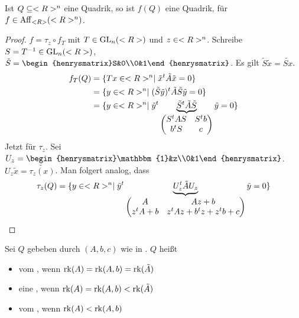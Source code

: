 \begin{lemma}
	Ist $Q\subseteq<R>^n$ eine Quadrik, so ist $f(Q)$ eine Quadrik, für $f\in\operatorname{Aff}_{<R>}(<R>^n)$.
\end{lemma}
\begin{proof}
	$f=\tau_z\circ f_T$ mit $T\in\operatorname{GL}_n(<R>)$ und $z\in<R>^n$. Schreibe $S=T^{-1}\in\operatorname{GL}_n(<R>)$, $\tilde{S}=\begin{henrysmatrix}S&0\\0&1\end{henrysmatrix}$. Es gilt $\tilde{S}\tilde{x}=\tilde{Sx}$.
	\begin{align}
		f_T(Q)&=\{Tx\in<R>^n\mid \tilde{x}^t\tilde{A}\tilde{x}=0\}\notag \\
		&=\{y\in<R>^n\mid (\tilde{S}\tilde{y})^t\tilde{A}\tilde{S}\tilde{y}=0\}\notag \\
		&=\{y\in<R>^n\mid \tilde{y}^t\underbrace{\tilde{S}^t\tilde{A}\tilde{S}}_{\begin{pmatrix}S^tAS&S^tb\\b^tS&c\end{pmatrix}}\tilde{y}=0\}\notag
	\end{align}
	Jetzt für $\tau_z$. Sei $U_z=\begin{henrysmatrix}\mathbbm{1}&z\\0&1\end{henrysmatrix}$. $U_z\tilde{x}=\tilde{\tau_z(x)}$. Man folgert analog, dass 
	\begin{align}
		\tau_z(Q)=\{y\in<R>^n\mid \tilde{y}^t\underbrace{U_z^t\tilde{A}U_z}_{\begin{pmatrix} A&Az+b\\z^tA+b&z^tAz+b^tz+z^tb+c\end{pmatrix}}\tilde{y}=0\}\notag
	\end{align}
\end{proof}

\begin{definition}
	Sei $Q$ gebeben durch $(A,b,c)$ wie in . $Q$ heißt
	\begin{itemize}
		\item vom , wenn $\operatorname{rk}(A)=\operatorname{rk}(A,b)=\operatorname{rk}(\tilde{A})$
		\item eine , wenn $\operatorname{rk}(A)=\operatorname{rk}(A,b)<\operatorname{rk}(\tilde{A})$
		\item vom , wenn $\operatorname{rk}(A)<\operatorname{rk}(A,b)$
	\end{itemize}
\end{definition}

